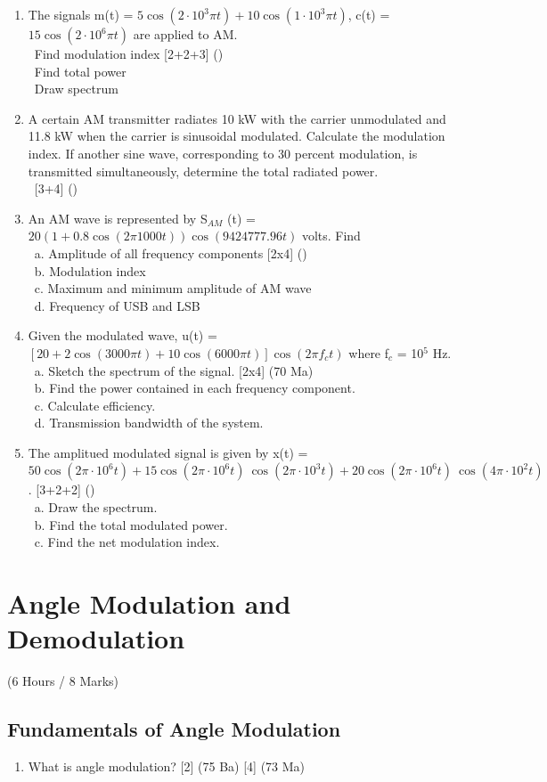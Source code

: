 \documentclass[12pt]{article}
\newcommand{\enter}{\\\textcolor{white}{1}}
\begin{document}
\begin{enumerate}
      \item The signals m(t) = $5 \cos(2\cdot 10^3\pi t) + 10 \cos(1\cdot 10^3\pi t)$, c(t) = $15 \cos(2\cdot 10^6\pi t)$ are applied to AM.
      \enter Find modulation index \hfill [2+2+3] ()
      \enter Find total power
      \enter Draw spectrum

      \item A certain AM transmitter radiates 10 kW with the carrier unmodulated and 11.8 kW when the carrier is sinusoidal modulated. Calculate the modulation index. If another sine wave, corresponding to 30 percent modulation, is transmitted simultaneously, determine the total radiated power.
      \enter\hfill [3+4] ()

      \item An AM wave is represented by S$_{AM}$ (t) = $20(1 + 0.8 \cos(2\pi 1000t)) \cos(9424777.96t)$ volts. Find
      \enter a. Amplitude of all frequency components \hfill [2x4] ()
      \enter b. Modulation index
      \enter c. Maximum and minimum amplitude of AM wave
      \enter d. Frequency of USB and LSB

      \item Given the modulated wave, u(t) = $\left[ 20 + 2 \cos(3000\pi t) + 10 \cos(6000\pi t)\right] \cos(2\pi f_c t)$ where f$_c$ = 10$^5$ Hz.
      \enter a. Sketch the spectrum of the signal. \hfill [2x4] (70 Ma)
      \enter b. Find the power contained in each frequency component.
      \enter c. Calculate efficiency.
      \enter d. Transmission bandwidth of the system.

      \item The amplitued modulated signal is given by x(t) = $50 \cos(2\pi \cdot 10^6t) + 15 \cos(2\pi \cdot 10^6t)\ \cos(2\pi \cdot 10^3t) + 20 \cos(2\pi \cdot 10^6t)\ \cos(4\pi \cdot 10^2t)$. \hfill [3+2+2] ()
      \enter a. Draw the spectrum.
      \enter b. Find the total modulated power.
      \enter c. Find the net modulation index.
    \end{enumerate}

\pagebreak

\section{Angle Modulation and Demodulation}
  \begin{center}(6 Hours / 8 Marks)\end{center}

  \subsection{Fundamentals of Angle Modulation}
    \begin{enumerate}
      \item What is angle modulation? \hfill [2] (75 Ba) [4] (73 Ma)
    \end{enumerate}
\end{document}
